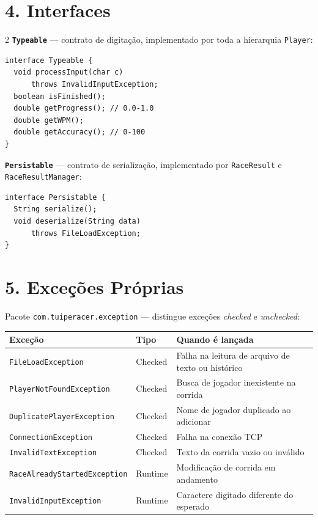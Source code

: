 \documentclass[11pt,a4paper]{article}
\begin{document}
\section*{4. Interfaces}

\begin{multicols}{2}
\textbf{\texttt{Typeable}} — contrato de digitação, implementado por toda a hierarquia \texttt{Player}:
\begin{lstlisting}[style=javastyle]
interface Typeable {
  void processInput(char c)
      throws InvalidInputException;
  boolean isFinished();
  double getProgress(); // 0.0-1.0
  double getWPM();
  double getAccuracy(); // 0-100
}
\end{lstlisting}

\columnbreak
\textbf{\texttt{Persistable}} — contrato de serialização, implementado por \texttt{RaceResult} e \texttt{RaceResultManager}:
\begin{lstlisting}[style=javastyle]
interface Persistable {
  String serialize();
  void deserialize(String data)
      throws FileLoadException;
}
\end{lstlisting}
\end{multicols}

\section*{5. Exceções Próprias}

Pacote \texttt{com.tuiperacer.exception} — distingue exceções \emph{checked} e \emph{unchecked}:

\begin{table}[H]
\centering\small
\renewcommand{\arraystretch}{1.15}
\begin{tabularx}{\textwidth}{llX}
\toprule
\textbf{Exceção} & \textbf{Tipo} & \textbf{Quando é lançada} \\
\midrule
\texttt{FileLoadException}          & Checked & Falha na leitura de arquivo de texto ou histórico \\
\texttt{PlayerNotFoundException}    & Checked & Busca de jogador inexistente na corrida \\
\texttt{DuplicatePlayerException}   & Checked & Nome de jogador duplicado ao adicionar \\
\texttt{ConnectionException}        & Checked & Falha na conexão TCP \\
\texttt{InvalidTextException}       & Checked & Texto da corrida vazio ou inválido \\
\texttt{RaceAlreadyStartedException}& Runtime & Modificação de corrida em andamento \\
\texttt{InvalidInputException}      & Runtime & Caractere digitado diferente do esperado \\
\bottomrule
\end{tabularx}
\end{table}
\end{document}

